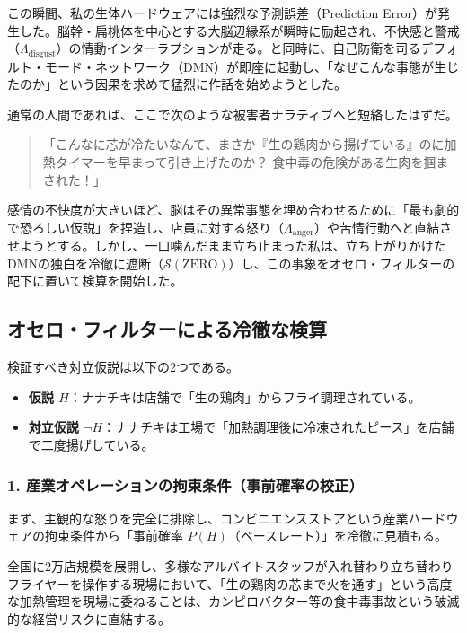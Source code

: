 この瞬間、私の生体ハードウェアには強烈な予測誤差（Prediction Error）が発生した。脳幹・扁桃体を中心とする大脳辺縁系が瞬時に励起され、不快感と警戒（$\Lambda_{\mathrm{disgust}}$）の情動インターラプションが走る。と同時に、自己防衛を司るデフォルト・モード・ネットワーク（DMN）が即座に起動し、「なぜこんな事態が生じたのか」という因果を求めて猛烈に作話を始めようとした。

通常の人間であれば、ここで次のような被害者ナラティブへと短絡したはずだ。
\begin{quote}
「こんなに芯が冷たいなんて、まさか『生の鶏肉から揚げている』のに加熱タイマーを早まって引き上げたのか？ 食中毒の危険がある生肉を掴まされた！」
\end{quote}

感情の不快度が大きいほど、脳はその異常事態を埋め合わせるために「最も劇的で恐ろしい仮説」を捏造し、店員に対する怒り（$\Lambda_{\mathrm{anger}}$）や苦情行動へと直結させようとする。しかし、一口噛んだまま立ち止まった私は、立ち上がりかけたDMNの独白を冷徹に遮断（$\mathcal{S}(\mathrm{ZERO})$）し、この事象をオセロ・フィルターの配下に置いて検算を開始した。

\subsection{オセロ・フィルターによる冷徹な検算}

検証すべき対立仮説は以下の2つである。
\begin{itemize}
    \item \textbf{仮説 $H$}：ナナチキは店舗で「生の鶏肉」からフライ調理されている。
    \item \textbf{対立仮説 $\neg H$}：ナナチキは工場で「加熱調理後に冷凍されたピース」を店舗で二度揚げしている。
\end{itemize}

\subsubsection{1. 産業オペレーションの拘束条件（事前確率の校正）}

まず、主観的な怒りを完全に排除し、コンビニエンスストアという産業ハードウェアの拘束条件から「事前確率 $P(H)$（ベースレート）」を冷徹に見積もる。

全国に2万店規模を展開し、多様なアルバイトスタッフが入れ替わり立ち替わりフライヤーを操作する現場において、「生の鶏肉の芯まで火を通す」という高度な加熱管理を現場に委ねることは、カンピロバクター等の食中毒事故という破滅的な経営リスクに直結する。

